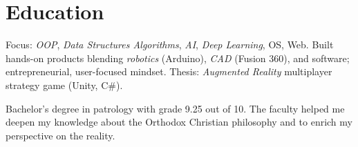 %


\section{Education}

{
\idea Focus: \emph{OOP}, \emph{Data Structures \/ Algorithms}, \emph{AI}, \emph{Deep Learning}, OS, Web.
\idea Built hands-on products blending \emph{robotics} (Arduino), \emph{CAD} (Fusion 360), and software; entrepreneurial, user-focused mindset.
\idea Thesis: \emph{Augmented Reality} multiplayer strategy game (Unity, C\#).
}

{
\idea Bachelor’s degree in patrology with grade 9.25 out of 10.
\idea The faculty helped me deepen my knowledge about the Orthodox Christian philosophy and to
enrich my perspective on the reality.
}